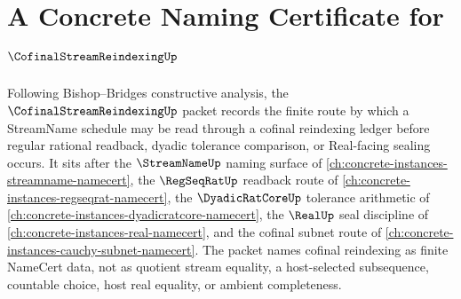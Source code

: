 \chapter{A Concrete Naming Certificate for $\CofinalStreamReindexingUp$}
\label{ch:concrete-instances-cofinal-stream-reindexing-namecert}

Following Bishop--Bridges constructive analysis, the $\CofinalStreamReindexingUp$ packet records the finite route by which a StreamName schedule may be read through a cofinal reindexing ledger before regular rational readback, dyadic tolerance comparison, or Real-facing sealing occurs. It sits after the $\StreamNameUp$ naming surface of \autoref{ch:concrete-instances-streamname-namecert}, the $\RegSeqRatUp$ readback route of \autoref{ch:concrete-instances-regseqrat-namecert}, the $\DyadicRatCoreUp$ tolerance arithmetic of \autoref{ch:concrete-instances-dyadicratcore-namecert}, the $\RealUp$ seal discipline of \autoref{ch:concrete-instances-real-namecert}, and the cofinal subnet route of \autoref{ch:concrete-instances-cauchy-subnet-namecert}. The packet names cofinal reindexing as finite NameCert data, not as quotient stream equality, a host-selected subsequence, countable choice, host real equality, or ambient completeness.


